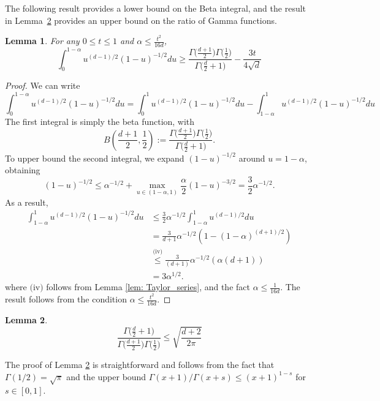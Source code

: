 \documentclass[11pt,twoside]{article}
\newtheorem{lemma}{Lemma}
\newcommand{\1}{\mathbf{1}}
\begin{document}
The following result provides a lower bound on the Beta integral, and the result in Lemma~\ref{lem: beta_function} provides
an upper bound on the ratio of Gamma functions. 
\begin{lemma}
	\label{lem: beta_integral}
	For any $0 \leq t \leq 1$ and $\alpha \leq \frac{t^2}{16 d}$,
	\begin{equation*}
	\int_{0}^{1 - \alpha}u^{(d-1)/2}(1 - u)^{-1/2}du \geq \frac{\Gamma\bigl(\frac{d + 1}{2}\bigr)\Gamma\bigl(\frac{1}{2}\bigr)}{ \Gamma\bigl(\frac{d}{2}+ 1\bigr)} - \frac{3t}{4\sqrt{d}}
	\end{equation*}
\end{lemma}
\begin{proof}
	We can write 
	\begin{equation*}
	\int_{0}^{1 - \alpha}u^{(d-1)/2}(1 - u)^{-1/2}du = \int_{0}^{1}u^{(d-1)/2}(1 - u)^{-1/2}du - \int_{1 - \alpha}^{1}u^{(d-1)/2}(1 - u)^{-1/2}du
	\end{equation*}
	The first integral is simply the beta function, with
	\begin{equation*}
	B(\frac{d+1}{2},\frac{1}{2}) := \frac{\Gamma\bigl(\frac{d + 1}{2}\bigr)\Gamma\bigl(\frac{1}{2}\bigr)}{ \Gamma\bigl(\frac{d}{2}+ 1\bigr)}.
	\end{equation*}
	To upper bound the second integral, we expand $(1 - u)^{-1/2}$ around $u = 1 - \alpha$, obtaining
	\begin{equation*}
	(1 - u)^{-1/2} \leq \alpha^{-1/2} + \max_{u \in (1 - \alpha, 1)} \frac{\alpha}{2} (1 - u)^{-3/2} = \frac{3}{2}\alpha^{-1/2}.
	\end{equation*}
	As a result,
	\begin{align*}
	\int_{1 - \alpha}^{1}u^{(d-1)/2}(1 - u)^{-1/2}du & \leq \frac{3}{2}\alpha^{-1/2} \int_{1 - \alpha}^{1}u^{(d-1)/2}du \\
	& = \frac{3}{d+1}\alpha^{-1/2} \left(1 - (1 - \alpha)^{(d + 1)/2}\right) \\
	& \overset{\text{(iv)}}{\leq} \frac{3}{(d+1)}\alpha^{-1/2} (\alpha(d + 1)) \\
	& =  3\alpha^{1/2}.
	\end{align*}
	where $\text{(iv)}$ follows from Lemma \ref{lem: Taylor_series}, and the fact $\alpha \leq \frac{1}{16d}$. The result follows from the condition $\alpha \leq \frac{t^2}{16d}$. 
\end{proof}

\begin{lemma}
	\label{lem: beta_function}
	\begin{equation*}
	\frac{\Gamma\bigl(\frac{d}{2}+ 1\bigr)}{\Gamma\bigl(\frac{d + 1}{2}\bigr) \Gamma\bigl(\frac{1}{2}\bigr)} \leq \sqrt{\frac{d + 2}{2\pi}}
	\end{equation*}
\end{lemma}
\noindent The proof of Lemma \ref{lem: beta_function} is straightforward and follows from the fact that $\Gamma(1/2) = \sqrt{\pi}$ and the upper bound $\Gamma(x + 1)/ \Gamma(x+s) \leq (x + 1)^{1-s}$ for $s \in [0,1]$.
\end{document}
